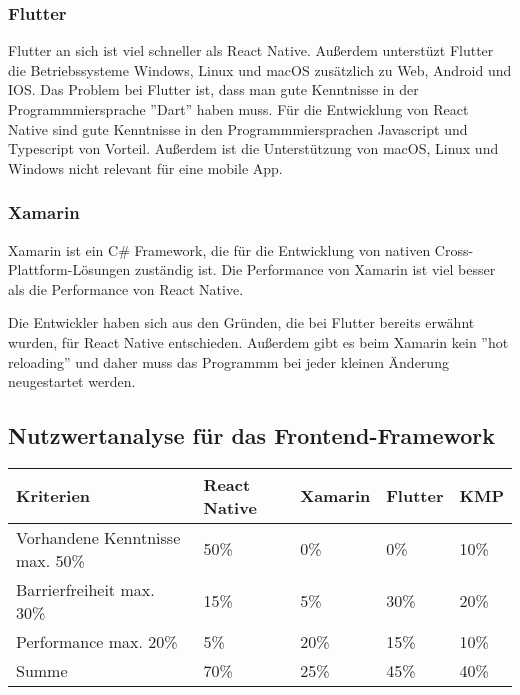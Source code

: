 \subsubsection{Flutter}

Flutter an sich ist viel schneller als React Native.
Außerdem unterstüzt Flutter die Betriebssysteme  Windows, Linux und macOS zusätzlich zu Web, Android und IOS.
\cite{flutter-vs-react-native}
\newline
Das Problem bei Flutter ist, dass man gute Kenntnisse in der Programmmiersprache ''Dart'' haben muss. \cite{flutter-vs-react-native}
Für die Entwicklung von React Native sind gute Kenntnisse in den Programmmiersprachen Javascript und Typescript von Vorteil.
Außerdem ist die Unterstützung von macOS, Linux und Windows nicht relevant für eine mobile App.


\subsubsection{Xamarin}

Xamarin ist ein C\# Framework, die für die Entwicklung von nativen Cross-Plattform-Lösungen zuständig ist.
Die Performance von Xamarin ist viel besser als die Performance von React Native. \cite{xamarin-vs-react-native}

Die Entwickler haben sich aus den Gründen, die bei Flutter bereits erwähnt wurden, für React Native entschieden.
Außerdem gibt es beim Xamarin kein ''hot reloading'' und daher muss das
Programmm bei jeder kleinen Änderung neugestartet werden.\cite{xamarin-vs-react-native}



\subsection{Nutzwertanalyse für das Frontend-Framework}
\begin{tabular}{|p{5cm} | p{2cm} | p{2cm} | p{2cm} | p{2cm} | }
    \hline
    Kriterien                       & React Native & Xamarin & Flutter & KMP  \\
    \hline
    Vorhandene Kenntnisse max. 50\% & 50\%         & 0\%     & 0\%     & 10\% \\
    \hline
    Barrierfreiheit max. 30\%       & 15\%         & 5\%     & 30\%    & 20\% \\
    \hline
    Performance max. 20\%           & 5\%          & 20\%    & 15\%    & 10\% \\
    \hline
    Summe                           & 70\%         & 25\%    & 45\%    & 40\% \\
    \hline
\end{tabular}





